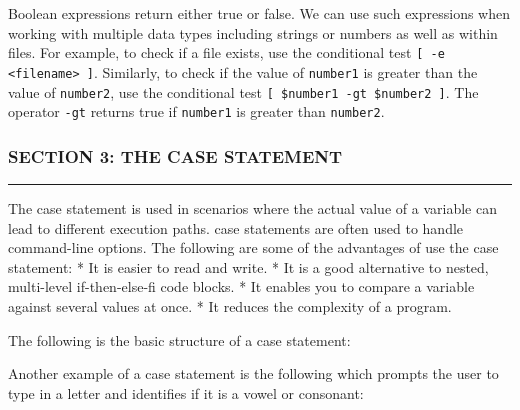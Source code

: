 Boolean expressions return either true or false. We can use such
expressions when working with multiple data types including strings or
numbers as well as within files. For example, to check if a file exists,
use the conditional test
\texttt{{[} -e \textless{}filename\textgreater{} {]}}. Similarly, to
check if the value of \texttt{number1} is greater than the value of
\texttt{number2}, use the conditional test
\texttt{{[} \$number1 -gt \$number2 {]}}. The operator \texttt{-gt}
returns true if \texttt{number1} is greater than \texttt{number2}.

\subsubsection{SECTION 3: THE CASE
STATEMENT}\label{section-3-the-case-statement}

\begin{center}\rule{3in}{0.4pt}\end{center}

The case statement is used in scenarios where the actual value of a
variable can lead to different execution paths. case statements are
often used to handle command-line options. The following are some of the
advantages of use the case statement: * It is easier to read and write.
* It is a good alternative to nested, multi-level if-then-else-fi code
blocks. * It enables you to compare a variable against several values at
once. * It reduces the complexity of a program.

The following is the basic structure of a case statement:

\begin{Shaded}
\begin{Highlighting}[]
 
  \KeywordTok{)}  \KeywordTok{;;}
  \NormalTok{) } \KeywordTok{;;}
  \NormalTok{) } \KeywordTok{;;}
  \NormalTok{) } \KeywordTok{;;}
  \KeywordTok{*} \NormalTok{) } \KeywordTok{;;}
\end{Highlighting}
\end{Shaded}

Another example of a case statement is the following which prompts the
user to type in a letter and identifies if it is a vowel or consonant:

